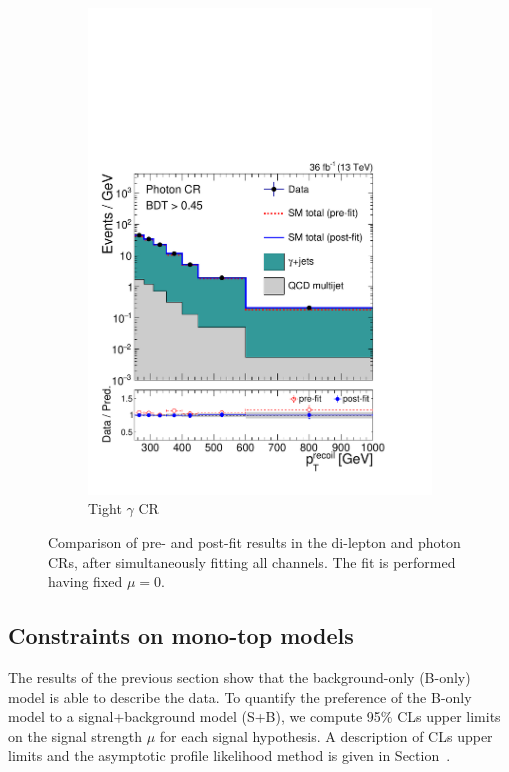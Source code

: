 \begin{figure}[]
\begin{center}
\begin{subfigure}[t]{0.24\textwidth}
            \includegraphics[width=\textwidth]{figures/monotop/postfit/stackedPostfit_photon_monotop.pdf}
            \caption{Tight $\gamma$ CR}
        \end{subfigure}
        \caption{Comparison of pre- and post-fit results in the di-lepton and photon CRs, after simultaneously fitting all channels.
        The fit is performed having fixed $\mu=0$.}
        \label{fig:mt:postfit_zgamma}
    \end{center}
\end{figure}


\subsection{Constraints on mono-top models}

The results of the previous section show that the background-only (B-only) model is able to describe the data.
To quantify the preference of the B-only model to a signal+background model (S+B), we compute 95\% CLs upper limits on the signal strength $\mu$ for each signal hypothesis.
A description of CLs upper limits and the asymptotic profile likelihood method is given in Section~\cite{sec:cls}.

